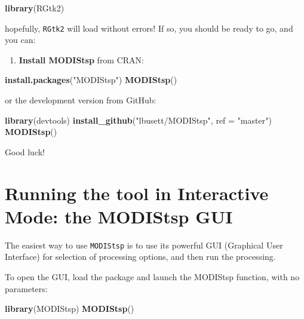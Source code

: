\documentclass[]{article}
\newenvironment{Shaded}{\begin{snugshade}}{\end{snugshade}}
\newcommand{\KeywordTok}[1]{\textcolor[rgb]{0.13,0.29,0.53}{\textbf{#1}}}
\newcommand{\DataTypeTok}[1]{\textcolor[rgb]{0.13,0.29,0.53}{#1}}
\newcommand{\StringTok}[1]{\textcolor[rgb]{0.31,0.60,0.02}{#1}}
\newcommand{\NormalTok}[1]{#1}
\providecommand{\tightlist}{%
  \setlength{\itemsep}{0pt}\setlength{\parskip}{0pt}}
\begin{document}
\begin{Shaded}
\begin{Highlighting}[]
\KeywordTok{library}\NormalTok{(RGtk2)}
\end{Highlighting}
\end{Shaded}

hopefully, \texttt{RGtk2} will load without errors! If so, you should be
ready to go, and you can:

\begin{enumerate}
\def\labelenumi{\arabic{enumi}.}
\setcounter{enumi}{6}
\tightlist
\item
  \textbf{Install MODIStsp} from CRAN:
\end{enumerate}

\begin{Shaded}
\begin{Highlighting}[]
\KeywordTok{install.packages}\NormalTok{(}\StringTok{"MODIStsp"}\NormalTok{)}
\KeywordTok{MODIStsp}\NormalTok{()}
\end{Highlighting}
\end{Shaded}

or the development version from GitHub:

\begin{Shaded}
\begin{Highlighting}[]
\KeywordTok{library}\NormalTok{(devtools) }
\KeywordTok{install_github}\NormalTok{(}\StringTok{"lbusett/MODIStsp"}\NormalTok{, }\DataTypeTok{ref =} \StringTok{"master"}\NormalTok{)}
\KeywordTok{MODIStsp}\NormalTok{()}
\end{Highlighting}
\end{Shaded}

Good luck!

\section{Running the tool in Interactive Mode: the MODIStsp
GUI}\label{running-the-tool-in-interactive-mode-the-modistsp-gui}

The easiest way to use \texttt{MODIStsp} is to use its powerful GUI
(Graphical User Interface) for selection of processing options, and then
run the processing.

To open the GUI, load the package and launch the MODIStsp function, with
no parameters:

\begin{Shaded}
\begin{Highlighting}[]
\KeywordTok{library}\NormalTok{(MODIStsp)}
\KeywordTok{MODIStsp}\NormalTok{()}
\end{Highlighting}
\end{Shaded}
\end{document}
